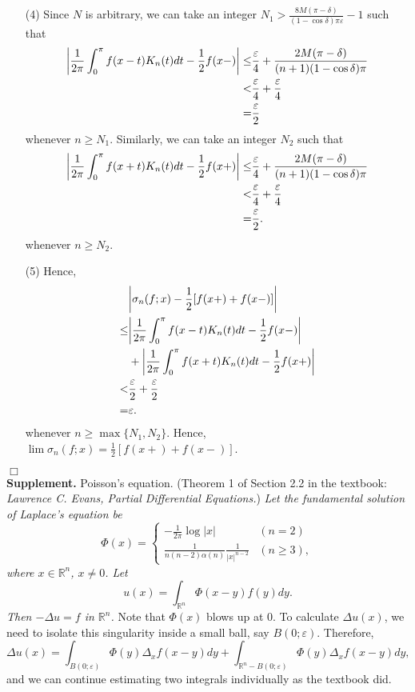 \documentclass{article}
\begin{document}
\begin{enumerate}
\item[(4)]
Since $N$ is arbitrary,
we can take an integer
$N_1 > \frac{8M(\pi-\delta)}{(1-\cos\delta)\pi\varepsilon} - 1$
such that
  \begin{align*}
    \abs{ \frac{1}{2\pi} \int_{0}^{\pi} f(x-t)K_{n}(t)dt - \frac{1}{2} f(x-) }
    \leq& \frac{\varepsilon}{4} + \frac{2M(\pi-\delta)}{(n+1)(1-\cos \delta)\pi} \\
    <& \frac{\varepsilon}{4} + \frac{\varepsilon}{4} \\
    =& \frac{\varepsilon}{2}
  \end{align*}
whenever $n \geq N_1$.
Similarly,
we can take an integer $N_2$ such that
  \begin{align*}
    \abs{ \frac{1}{2\pi} \int_{0}^{\pi} f(x+t)K_{n}(t)dt - \frac{1}{2} f(x+) }
    \leq& \frac{\varepsilon}{4} + \frac{2M(\pi-\delta)}{(n+1)(1-\cos \delta)\pi} \\
    <& \frac{\varepsilon}{4} + \frac{\varepsilon}{4} \\
    =& \frac{\varepsilon}{2}.
  \end{align*}
whenever $n \geq N_2$.

\item[(5)]
Hence,
  \begin{align*}
    &\abs{ \sigma_n(f;x) - \frac{1}{2}[f(x+)+f(x-)] } \\
    \leq& \abs{ \frac{1}{2\pi} \int_{0}^{\pi} f(x-t)K_{n}(t)dt - \frac{1}{2} f(x-) } \\
      &+ \abs{ \frac{1}{2\pi} \int_{0}^{\pi} f(x+t)K_{n}(t)dt - \frac{1}{2} f(x+) } \\
    <& \frac{\varepsilon}{2} + \frac{\varepsilon}{2} \\
    =& \varepsilon.
  \end{align*}
whenever $n \geq \max\{N_1,N_2\}$.
Hence, $\lim \sigma_n(f;x) = \frac{1}{2}[f(x+)+f(x-)]$.
\end{enumerate}
$\Box$ \\

\textbf{Supplement.} Poisson's equation.
(Theorem 1 of Section 2.2 in the textbook:
\emph{Lawrence C. Evans, Partial Differential Equations.})
\emph{Let the fundamental solution of Laplace's equation be
\begin{equation*}
  \Phi(x) =
    \begin{cases}
      -\frac{1}{2\pi} \log|x|                       & (n = 2) \\
      \frac{1}{n(n-2)\alpha(n)} \frac{1}{|x|^{n-2}} & (n \geq 3),
    \end{cases}
\end{equation*}
where $x \in \mathbb{R}^n$, $x \neq 0$.
Let
\[
  u(x) = \int_{\mathbb{R}^n} \Phi(x-y)f(y) dy.
\]
Then $-\Delta u = f$ in $\mathbb{R}^n$.}
Note that $\Phi(x)$ blows up at $0$.
To calculate $\Delta u(x)$,
we need to isolate this singularity inside a small ball, say $B(0;\varepsilon)$.
Therefore,
\[
  \Delta u(x)
  = \int_{B(0;\varepsilon)} \Phi(y) \Delta_x f(x-y)dy
    + \int_{\mathbb{R}^n - B(0;\varepsilon)} \Phi(y) \Delta_x f(x-y)dy,
\]
and we can continue estimating two integrals individually as the textbook did. \\\\
\end{document}
